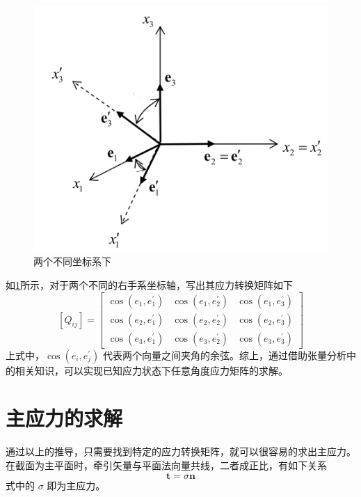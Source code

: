 \documentclass[12pt, a4paper]{ctexart}
\begin{document}
\begin{figure}
	\centering
	\includegraphics[scale=0.8]{26.png}
	\caption{两个不同坐标系下}
	\label{fig26}
\end{figure}

如\ref{fig26}所示，对于两个不同的右手系坐标轴，写出其应力转换矩阵如下
\begin{equation}
\left[Q_{i j}\right]=\left[ \begin{array}{ccc}{\cos \left(e_{1}, e_{1}^{\prime}\right)} & {\cos \left(e_{1}, e_{2}^{\prime}\right)} & {\cos \left(e_{1}, e_{3}^{\prime}\right)} \\ {\cos \left(e_{2}, e_{1}^{\prime}\right)} & {\cos \left(e_{2}, e_{2}^{\prime}\right)} & {\cos \left(e_{2}, e_{3}^{\prime}\right)} \\ {\cos \left(e_{3}, e_{1}^{\prime}\right)} & {\cos \left(e_{3}, e_{2}^{\prime}\right)} & {\cos \left(e_{3}, e_{3}^{\prime}\right)}\end{array}\right]
\end{equation}
上式中，$ \cos \left(e_{i}, e_{j}^{\prime}\right) $ 代表两个向量之间夹角的余弦。综上，通过借助张量分析中的相关知识，可以实现已知应力状态下任意角度应力矩阵的求解。

\section{主应力的求解}
通过以上的推导，只需要找到特定的应力转换矩阵，就可以很容易的求出主应力。在截面为主平面时，牵引矢量与平面法向量共线，二者成正比，有如下关系
\begin{equation} \label{eq3}
\mathbf{t}=\sigma \mathbf{n}
\end{equation}
式中的 $ \sigma $ 即为主应力。
\end{document}
